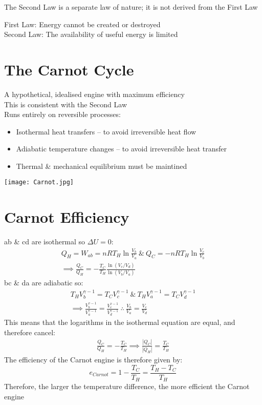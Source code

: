 \documentclass[a4paper, 11pt, fleqn, normalem]{report}
\begin{document}
The Second Law is a separate law of nature; it is not derived from the First Law

First Law: Energy cannot be created or destroyed \\
Second Law: The availability of useful energy is limited

\section*{The Carnot Cycle}
A hypothetical, idealised engine with maximum efficiency \\
This is consistent with the Second Law \\
Runs entirely on reversible processes:
\vspace{-8pt}
\begin{itemize}
	\item Isothermal heat transfers -- to avoid irreversible heat flow
	\item Adiabatic temperature changes -- to avoid irreversible heat transfer
	\item Thermal \& mechanical equilibrium must be maintined
\end{itemize}
\texttt{[image: Carnot.jpg]}

\section*{Carnot Efficiency}
ab \& cd are isothermal so ${\Delta}U = 0$:
\begin{gather*}
	Q_{H} = W_{ab} = nRT_{H}\ln{\frac{V_{b}}{V_{a}}} ~\&~ Q_{C} = -nRT_{H}\ln{\frac{V_{c}}{V_{b}}} \\
	\implies \frac{Q_{C}}{Q_{H}} = -\frac{T_{C}}{T_{H}}\frac{\ln{(V_{c}/V_{d})}}{\ln{(V_{b}/V_{a})}}
\end{gather*}
bc \& da are adiabatic so:
\begin{gather*}
	T_{H}V_{b}^{\gamma - 1} = T_{C}V_{c}^{\gamma - 1} ~\&~ T_{H}V_{a}^{\gamma - 1} = T_{C}V_{d}^{\gamma - 1} \\
	\implies \frac{V_{b}^{\gamma - 1}}{V_{a}^{\gamma - 1}} = \frac{V_{c}^{\gamma - 1}}{V_{d}^{\gamma - 1}} ~\therefore~ \frac{V_{b}}{V_{a}} = \frac{V_{c}}{V_{d}}
\end{gather*}
This means that the logarithms in the isothermal equation are equal, and therefore cancel:
\begin{gather*}
	\frac{Q_{C}}{Q_{H}} = -\frac{T_{C}}{T_{H}} \implies \frac{|Q_{C}|}{|Q_{H}|} = \frac{T_{C}}{T_{H}}
\end{gather*}
The efficiency of the Carnot engine is therefore given by:
\begin{equation*}
	e_{Carnot} = 1 - \frac{T_{C}}{T_{H}} = \frac{T_{H} - T_{C}}{T_{H}}
\end{equation*}
Therefore, the larger the temperature difference, the more efficient the Carnot engine
\end{document}
